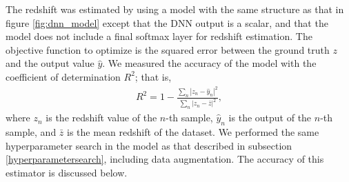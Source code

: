 \documentclass[proof]{pasj01}
\begin{document}
The redshift was estimated by using a model with the same structure as that in figure \ref{fig:dnn_model} except that the DNN output is a scalar, and that the model does not include a final softmax layer for redshift estimation.
The objective function to optimize is the squared error between the ground truth $z$ and the output value $\hat{y}$.
We measured the accuracy of the model with the coefficient of determination $R^2$; that is,
\begin{eqnarray*}
    R^2 = 1 - \frac{\sum_n \left| z_n - \hat{y}_n \right|^2}{\sum_n \left| z_n - \bar{z} \right|^2}, 
\end{eqnarray*}
where $z_n$ is the redshift value of the $n$-th sample, $\hat{y}_n$ is the output of the $n$-th sample, 
and $\bar{z}$ is the mean redshift of the dataset.
We performed the same hyperparameter search in the model as that described in subsection \ref{hyperparametersearch}, 
including data augmentation.
The accuracy of this estimator is discussed below.
\end{document}
